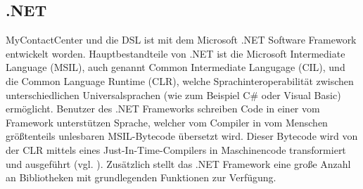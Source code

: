 \subsection{.NET}
MyContactCenter und die DSL ist mit dem Microsoft .NET Software Framework entwickelt worden. Hauptbestandteile von .NET ist die Microsoft Intermediate Language (MSIL), auch genannt Common Intermediate Langugage (CIL), und die Common Language Runtime (CLR), welche Sprachinteroperabilität zwischen unterschiedlichen Universalsprachen (wie zum Beispiel C\# oder Visual Basic) ermöglicht. Benutzer des .NET Frameworks schreiben Code in einer vom Framework unterstützen Sprache, welcher vom Compiler in vom Menschen größtenteils unlesbaren MSIL-Bytecode übersetzt wird. Dieser Bytecode wird von der CLR mittels eines Just-In-Time-Compilers in Maschinencode transformiert und ausgeführt (vgl. \cite[S. 16ff]{Platt:03}). Zusätzlich stellt das .NET Framework eine große Anzahl an Bibliotheken mit grundlegenden Funktionen zur Verfügung. 

